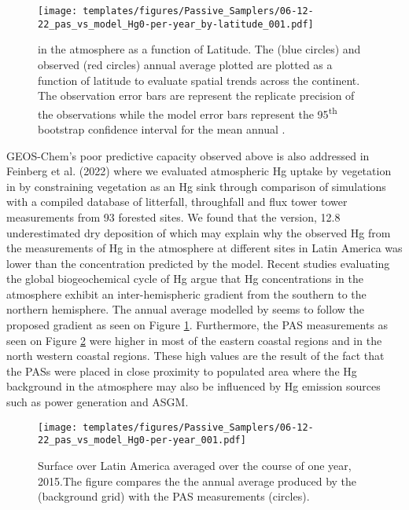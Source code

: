 \begin{figure}[H]
  \texttt{[image: templates/figures/Passive\_Samplers/06-12-22\_pas\_vs\_model\_Hg0-per-year\_by-latitude\_001.pdf]}
  \caption{\hg in the atmosphere as a function of Latitude. The \on (blue circles) and observed (red circles) annual average \hg plotted are plotted as a function of latitude to evaluate spatial trends across the continent. The observation error bars are represent the replicate precision of the observations while the model error bars represent the 95\textsuperscript{th} bootstrap confidence interval for the mean annual \hg.}
  \label{fig:06-12-22_pas_vs_model_Hg0-per-year_by-latitude_001}
  \centering
  
\end{figure}
\FloatBarrier

\begin{flushleft}
GEOS-Chem's poor predictive capacity observed above is also addressed in Feinberg et al. (2022) where we evaluated atmospheric Hg uptake by vegetation in \gc by constraining vegetation as an Hg sink through comparison of simulations with a compiled database of litterfall, throughfall and flux tower tower measurements from 93 forested sites. We found that the \gc version, 12.8  underestimated dry deposition of \hg which may explain why the observed Hg from the measurements of Hg in the atmosphere at different sites in Latin America was lower than the concentration predicted by the model. Recent studies evaluating the global biogeochemical cycle of Hg argue that Hg concentrations in the atmosphere exhibit an inter-hemispheric gradient from the southern to the northern hemisphere. The annual average \hg modelled by \gc seems to follow the proposed gradient as seen on Figure \ref{fig:06-12-22_pas_vs_model_Hg0-per-year_by-latitude_001}. Furthermore, the PAS measurements as seen on Figure \ref{fig:06-12-22_pas_vs_model_Hg0-per-year_001} were higher in most of the eastern coastal regions and in the north western coastal regions. These high values are the result of the fact that the PASs were placed in close proximity to populated area where the Hg background in the atmosphere may also be influenced by Hg emission sources such as power generation and ASGM.

\end{flushleft}

\begin{figure}[H]
  \texttt{[image: templates/figures/Passive\_Samplers/06-12-22\_pas\_vs\_model\_Hg0-per-year\_001.pdf]}
  \caption{Surface \hg over Latin America averaged over the course of one year, 2015.The figure compares the the annual average \hg produced by the \on (background grid) with the PAS measurements (circles).}
  \label{fig:06-12-22_pas_vs_model_Hg0-per-year_001}
  \centering
  
\end{figure}
\FloatBarrier



